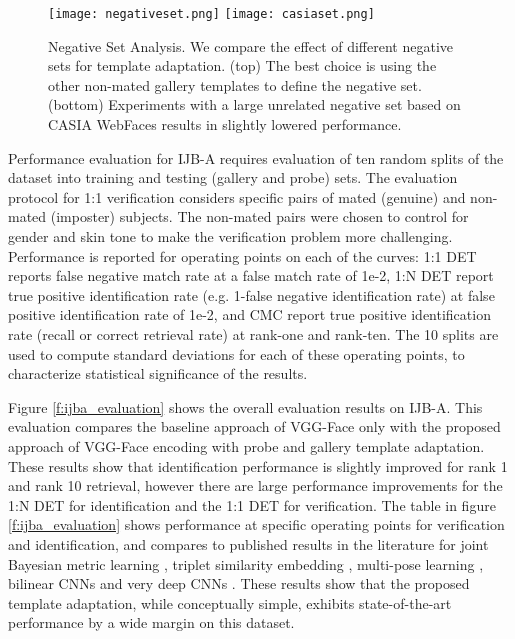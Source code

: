 \documentclass[10pt,twocolumn,letterpaper]{article}
\theoremstyle{definition}		\newtheorem{defn}[thm]{Definition}
\newcommand{\figwidth}{6.85in}
\newcommand{\ARXIV}{}
\begin{document}
\ifdefined\ARXIV
\begin{figure*}[!t]
\begin{centering}
\texttt{[image: negativeset.png]} 
\texttt{[image: casiaset.png]} 
\caption{Negative Set Analysis.  We compare the effect of different negative sets for template adaptation.  (top) The best choice is using the other non-mated gallery templates to define the negative set.  (bottom) Experiments with a large unrelated negative set based on CASIA WebFaces results in slightly lowered performance.}
\label{f:negativeset}
\end{centering}
\end{figure*}
 \fi

Performance evaluation for IJB-A requires evaluation of ten random splits of the dataset into training and testing (gallery and probe) sets. The evaluation protocol for 1:1 verification considers specific pairs of mated (genuine) and non-mated (imposter) subjects.  The non-mated pairs were chosen to control for gender and skin tone to make the verification problem more challenging.  Performance is reported for operating points on each of the curves:  1:1 DET reports false negative match rate at a false match rate of 1e-2, 1:N DET report true positive identification rate (e.g. 1-false negative identification rate) at false positive identification rate of 1e-2, and CMC report true positive identification rate (recall or correct retrieval rate) at rank-one and rank-ten.  The 10 splits are used to compute standard deviations for each of these operating points, to characterize statistical significance of the results. 

Figure \ref{f:ijba_evaluation} shows the overall evaluation results on IJB-A.  This evaluation compares the baseline approach of VGG-Face only \cite{Parkhi15} with the proposed approach of VGG-Face encoding with probe and gallery template adaptation.  These results show that identification performance is slightly improved for rank 1 and rank 10 retrieval, however there are large performance improvements for the 1:N DET for identification and the 1:1 DET for verification.  The table in figure \ref{f:ijba_evaluation} shows performance at specific operating points for verification and identification, and compares to published results in the literature for joint Bayesian metric learning \cite{Chen16}, triplet similarity embedding \cite{Sankaranarayanan16}, multi-pose learning \cite{AbdAlmageed16}, bilinear CNNs \cite{RoyChowdry16} and very deep CNNs \cite{Parkhi15,Wang15}.  These results show that the proposed template adaptation, while conceptually simple, exhibits state-of-the-art performance by a wide margin on this dataset.
\end{document}
